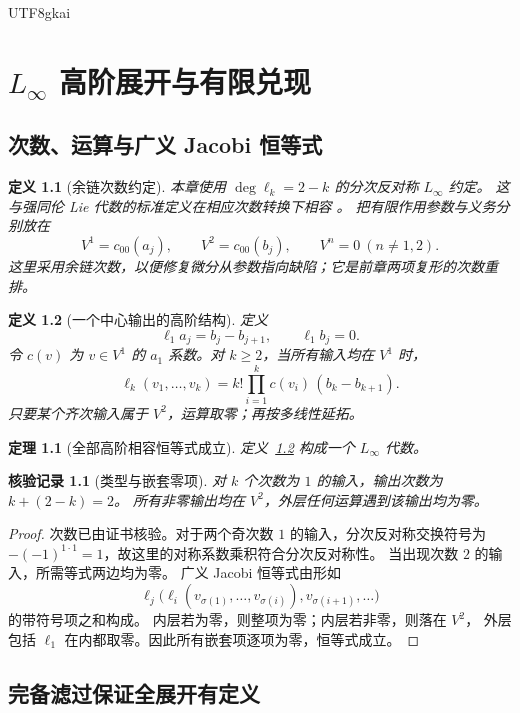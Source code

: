 \documentclass[12pt,a4paper,openany]{report}
\newtheorem{definition}{定义}[chapter]
\newtheorem{theorem}{定理}[chapter]
\newtheorem{Certificate}{核验记录}[chapter]
\numberwithin{equation}{chapter}
\newcommand{\Linfty}{L_\infty}
\begin{document}
\begin{CJK*}{UTF8}{gkai}
\chapter{\texorpdfstring{$L_\infty$}{L-infinity} 高阶展开与有限兑现}
\label{chap:linfty}

\section{次数、运算与广义 Jacobi 恒等式}

\begin{definition}[余链次数约定]
本章使用 $\deg\ell_k=2-k$ 的分次反对称 $\Linfty$ 约定。
这与强同伦 Lie 代数的标准定义在相应次数转换下相容
\cite{LadaMarkl1995}。
把有限作用参数与义务分别放在
\[
 V^1=c_{00}(a_j),\qquad V^2=c_{00}(b_j),\qquad
 V^n=0\ (n\ne1,2).
\]
这里采用余链次数，以便修复微分从参数指向缺陷；它是前章两项复形的次数重排。
\end{definition}

\begin{definition}[一个中心输出的高阶结构]
\label{def:linfty}
定义
\[
 \ell_1a_j=b_j-b_{j+1},\qquad\ell_1b_j=0.
\]
令 $c(v)$ 为 $v\in V^1$ 的 $a_1$ 系数。对 $k\ge2$，当所有输入均在 $V^1$ 时，
\[
 \boxed{
 \ell_k(v_1,\ldots,v_k)=
 k!\prod_{i=1}^k c(v_i)\,(b_k-b_{k+1})}.
\]
只要某个齐次输入属于 $V^2$，运算取零；再按多线性延拓。
\end{definition}

\begin{theorem}[全部高阶相容恒等式成立]
\label{thm:linfty}
定义~\ref{def:linfty} 构成一个 $\Linfty$ 代数。
\end{theorem}
\begin{Certificate}[类型与嵌套零项]
对 $k$ 个次数为 $1$ 的输入，输出次数为 $k+(2-k)=2$。
所有非零输出均在 $V^2$，外层任何运算遇到该输出均为零。
\end{Certificate}
\begin{proof}
次数已由证书核验。对于两个奇次数 $1$ 的输入，分次反对称交换符号为
$-(-1)^{1\cdot1}=1$，故这里的对称系数乘积符合分次反对称性。
当出现次数 $2$ 的输入，所需等式两边均为零。
广义 Jacobi 恒等式由形如
\[
 \ell_j\bigl(\ell_i(v_{\sigma(1)},\ldots,v_{\sigma(i)}),
                    v_{\sigma(i+1)},\ldots\bigr)
\]
的带符号项之和构成。
内层若为零，则整项为零；内层若非零，则落在 $V^2$，
外层包括 $\ell_1$ 在内都取零。因此所有嵌套项逐项为零，恒等式成立。
\end{proof}

\section{完备滤过保证全展开有定义}


\end{CJK*}
\end{document}
